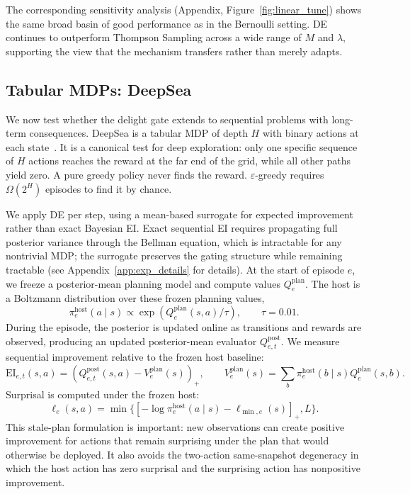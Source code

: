 \documentclass{article}
\newcommand{\surp}{\ell} %
\newcommand{\EI}{\mathrm{EI}} %
\begin{document}
The corresponding sensitivity analysis (Appendix, Figure~\ref{fig:linear_tune}) shows the same broad basin of good performance as in the Bernoulli setting.
DE continues to outperform Thompson Sampling across a wide range of $M$ and $\lambda$, supporting the view that the mechanism transfers rather than merely adapts.


\subsection{Tabular MDPs: DeepSea}
\label{sec:exp_deepsea}

We now test whether the delight gate extends to sequential problems with long-term consequences.
DeepSea is a tabular MDP of depth $H$ with binary actions at each state~\citep{osband2016deep,osband2020bsuite}.
It is a canonical test for deep exploration: only one specific sequence of $H$ actions reaches the reward at the far end of the grid, while all other paths yield zero.
A pure greedy policy never finds the reward.
$\varepsilon$-greedy requires $\Omega(2^H)$ episodes to find it by chance.

We apply DE per step, using a mean-based surrogate for expected improvement rather than exact Bayesian EI.
Exact sequential EI requires propagating full posterior variance through the Bellman equation, which is intractable for any nontrivial MDP; the surrogate preserves the gating structure while remaining tractable (see Appendix~\ref{app:exp_details} for details).
At the start of episode $e$, we freeze a posterior-mean planning model and compute values $Q^{\mathrm{plan}}_e$.
The host is a Boltzmann distribution over these frozen planning values,
\[
  \pi^{\mathrm{host}}_e(a\mid s)
  \propto
  \exp(Q^{\mathrm{plan}}_e(s,a)/\tau),
  \qquad \tau=0.01.
\]
During the episode, the posterior is updated online as transitions and rewards are observed, producing an updated posterior-mean evaluator $Q^{\mathrm{post}}_{e,t}$.
We measure sequential improvement relative to the frozen host baseline:
\[
  \EI_{e,t}(s,a)
  =
  \left(Q^{\mathrm{post}}_{e,t}(s,a)-V^{\mathrm{plan}}_e(s)\right)_+,
  \qquad
  V^{\mathrm{plan}}_e(s)
  =
  \sum_b \pi^{\mathrm{host}}_e(b\mid s)Q^{\mathrm{plan}}_e(s,b).
\]
Surprisal is computed under the frozen host:
\[
  \surp_e(s,a)
  =
  \min\{[-\log \pi^{\mathrm{host}}_e(a\mid s)-\ell_{\min,e}(s)]_+,L\}.
\]
This stale-plan formulation is important: new observations can create positive improvement for actions that remain surprising under the plan that would otherwise be deployed.
It also avoids the two-action same-snapshot degeneracy in which the host action has zero surprisal and the surprising action has nonpositive improvement.
\end{document}
